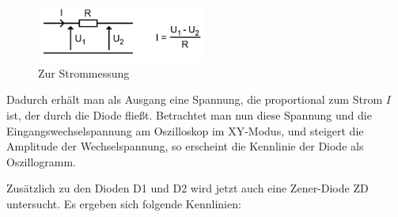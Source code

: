 \begin{figure}[H]
    \centering
    \includegraphics[width=0.5\textwidth]{figs/2/strom.png}
    \caption{Zur Strommessung}
    \label{fig:2_strom}
\end{figure}

Dadurch erhält man als Ausgang eine Spannung, die proportional zum Strom $I$ ist, der durch die Diode fließt.
Betrachtet man nun diese Spannung und die Eingangswechselspannung am Oszilloskop im XY-Modus, und steigert die Amplitude der Wechselspannung,
so erscheint die Kennlinie der Diode als Oszillogramm.


Zusätzlich zu den Dioden D1 und D2 wird jetzt auch eine Zener-Diode ZD untersucht.
Es ergeben sich folgende Kennlinien:


